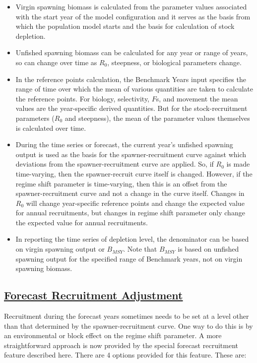 \begin{itemize}
	\item Virgin spawning biomass is calculated from the parameter values associated with the start year of the model configuration and it serves as the basis from which the population model starts and the basis for calculation of stock depletion.
	
	\item Unfished spawning biomass can be calculated for any year or range of years, so can change over time as $R_{0}$, steepness, or biological parameters change.
	
	\item In the reference points calculation, the Benchmark Years input specifies the range of time over which the mean of various quantities are taken to calculate the reference points. For biology, selectivity, $F$s, and movement the mean values are the year-specific derived quantities. But for the stock-recruitment parameters ($R_{0}$ and steepness), the mean of the parameter values themselves is calculated over time.
	
	\item During the time series or forecast, the current year's unfished spawning output is used as the basis for the spawner-recruitment curve against which deviations from the spawner-recruitment curve are applied. So, if $R_{0}$ is made time-varying, then the spawner-recruit curve itself is changed. However, if the regime shift parameter is time-varying, then this is an offset from the spawner-recruitment curve and not a change in the curve itself. Changes in $R_{0}$ will change year-specific reference points and change the expected value for annual recruitments, but changes in regime shift parameter only change the expected value for annual recruitments.
	
	\item In reporting the time series of depletion level, the denominator can be based on virgin spawning output or $B_{MSY}$. Note that $B_{MSY}$ is based on unfished spawning output for the specified range of Benchmark years, not on virgin spawning biomass.
\end{itemize}


\hypertarget{ForeSpawn}{}
\subsection[Forecast Recruitment Adjustment]{\protect\hyperlink{ForeSpawn}{Forecast Recruitment Adjustment}}
Recruitment during the forecast years sometimes needs to be set at a level other than that determined by the spawner-recruitment curve. One way to do this is by an environmental or block effect on the regime shift parameter. A more straightforward approach is now provided by the special forecast recruitment feature described here. There are 4 options provided for this feature. These are:

